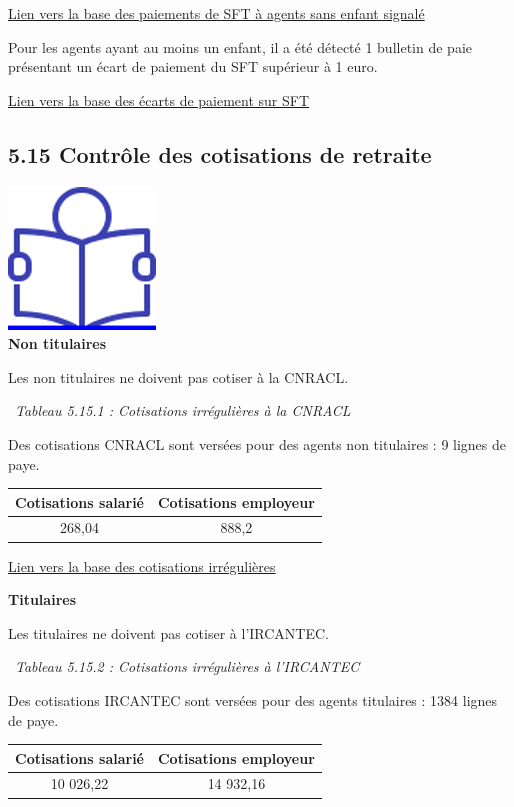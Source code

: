 \href{../Bases/Reglementation/Paie.sans.enfant.reduit.csv}{Lien vers la
base des paiements de SFT à agents sans enfant signalé}

Pour les agents ayant au moins un enfant, il a été détecté 1 bulletin de
paie présentant un écart de paiement du SFT supérieur à 1 euro.

\href{../Bases/Reglementation/controle.sft.csv}{Lien vers la base des
écarts de paiement sur SFT}

\hypertarget{controle-des-cotisations-de-retraite}{%
\subsection{5.15 Contrôle des cotisations de
retraite}\label{controle-des-cotisations-de-retraite}}

\href{../Docs/Notices/fiche_retraite.odt}{\includegraphics{icones/Notice.png}}\\
\textbf{Non titulaires}

Les non titulaires ne doivent pas cotiser à la CNRACL.

~\emph{Tableau 5.15.1 : Cotisations irrégulières à la CNRACL}

Des cotisations CNRACL sont versées pour des agents non titulaires : 9
lignes de paye.

\begin{longtable}[]{@{}cc@{}}
\toprule
Cotisations salarié & Cotisations employeur\tabularnewline
\midrule
\endhead
268,04 & 888,2\tabularnewline
\bottomrule
\end{longtable}

\href{../Bases/Reglementation/Cotisations.irreg.csv}{Lien vers la base des
cotisations irrégulières}

\textbf{Titulaires}

Les titulaires ne doivent pas cotiser à l'IRCANTEC.

~\emph{Tableau 5.15.2 : Cotisations irrégulières à l'IRCANTEC}

Des cotisations IRCANTEC sont versées pour des agents titulaires : 1384
lignes de paye.

\begin{longtable}[]{@{}cc@{}}
\toprule
Cotisations salarié & Cotisations employeur\tabularnewline
\midrule
\endhead
10 026,22 & 14 932,16\tabularnewline
\bottomrule
\end{longtable}

